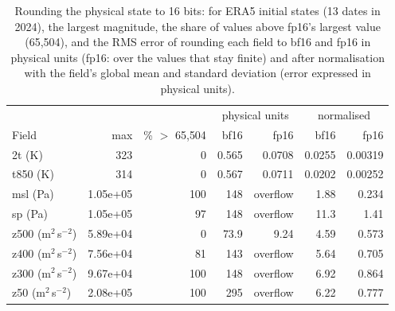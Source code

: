 \begin{table}[tbp]
\centering
\small
\caption{Rounding the physical state to 16 bits: for ERA5 initial states (13 dates in 2024), the largest magnitude, the share of values above fp16's largest value (65,504), and the RMS error of rounding each field to bf16 and fp16 in physical units (fp16: over the values that stay finite) and after normalisation with the field's global mean and standard deviation (error expressed in physical units).}
\label{tab:state-rounding}
\begin{tabular}{lrrrrrr}
\toprule
 & & & \multicolumn{2}{c}{physical units} & \multicolumn{2}{c}{normalised} \\
Field & max & \% $>$ 65{,}504 & bf16 & fp16 & bf16 & fp16 \\
\midrule
2t (K) & 323 & 0 & 0.565 & 0.0708 & 0.0255 & 0.00319 \\
t850 (K) & 314 & 0 & 0.567 & 0.0711 & 0.0202 & 0.00252 \\
msl (Pa) & 1.05e+05 & 100 & 148 & overflow & 1.88 & 0.234 \\
sp (Pa) & 1.05e+05 & 97 & 148 & overflow & 11.3 & 1.41 \\
z500 (m$^2$\,s$^{-2}$) & 5.89e+04 & 0 & 73.9 & 9.24 & 4.59 & 0.573 \\
z400 (m$^2$\,s$^{-2}$) & 7.56e+04 & 81 & 143 & overflow & 5.64 & 0.705 \\
z300 (m$^2$\,s$^{-2}$) & 9.67e+04 & 100 & 148 & overflow & 6.92 & 0.864 \\
z50 (m$^2$\,s$^{-2}$) & 2.08e+05 & 100 & 295 & overflow & 6.22 & 0.777 \\
\bottomrule
\end{tabular}
\end{table}
